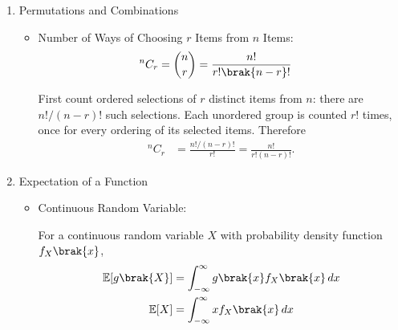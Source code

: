 \begin{enumerate}[label=\thesubsection.\arabic*, ref=\thesubsection.\theenumi,itemsep=0pt]
\begin{itemize}
\solution
The mean of a continuous distribution is its first moment divided by its total area. Hence
\begin{align}
\bar{t}
&=\frac{\int_0^\infty tE(t)\,dt}{\int_0^\infty E(t)\,dt}.
\end{align}
For a normalized residence time distribution, the total area is one:
\begin{align}
\int_0^\infty E(t)\,dt&=1.
\end{align}
Substituting this normalization into the ratio yields
\begin{align}
\bar{t}&=\int_0^\infty tE(t)\,dt.
\end{align}
\end{itemize}

\item Permutations and Combinations
\begin{itemize}
\item Number of Ways of Choosing $r$ Items from $n$ Items:
\begin{align}
{}^nC_r
&= \binom{n}{r}
=\frac{n!}{r!\brak{n-r}!}
\label{eq:combination_formula}
\end{align}

\solution
First count ordered selections of $r$ distinct items from $n$: there are $n!/(n-r)!$ such selections. Each unordered group is counted $r!$ times, once for every ordering of its selected items. Therefore
\begin{align}
{}^nC_r
&=\frac{n!/(n-r)!}{r!}
=\frac{n!}{r!(n-r)!}.
\end{align}
\end{itemize}

\item Expectation of a Function
\begin{itemize}
\item Continuous Random Variable:

For a continuous random variable $X$ with probability density function $f_X\brak{x}$,
\begin{align}
\mathbb{E}[g\brak{X}]
&= \int_{-\infty}^{\infty}g\brak{x}f_X\brak{x}\,dx
\label{eq:expectation_continuous}\\
\mathbb{E}[X]
&= \int_{-\infty}^{\infty}xf_X\brak{x}\,dx
\label{eq:expectation_x}
\end{align}



\end{itemize}
\end{enumerate}
